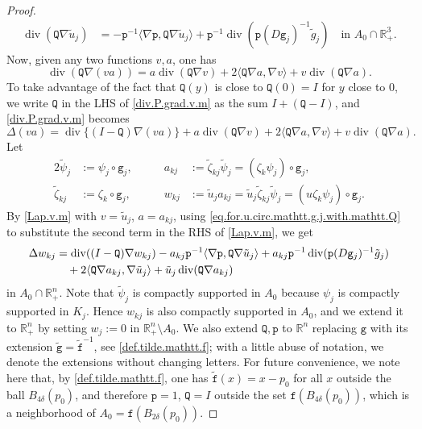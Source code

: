 \documentclass[10pt,reqno,a4paper]{article}
\numberwithin{equation}{section}
\theoremstyle{plain}
\theoremstyle{definition}
\newcommand{\R}{{\mathbb R}}
\newcommand{\la}{\langle}
\newcommand{\ra}{\rangle}
\newcommand{\grad}{\nabla}
\DeclareMathOperator{\divergence}{div}
\begin{document}
\begin{proof}
\begin{align} 
\divergence (\mathtt Q \grad \tilde u_j) 
& = - \mathtt p^{-1} \la \grad \mathtt p , \mathtt Q \grad \tilde u_j \ra
+ \mathtt p^{-1} \divergence (\mathtt p (D \mathtt g_j)^{-1} \tilde g_j) 
\quad \text{in } A_0 \cap \R^3_+.
\label{eq.for.u.circ.mathtt.g.j.with.mathtt.Q}
\end{align}
Now, given any two functions $v,a$, one has 
\begin{equation} \label{div.P.grad.v.m}
\divergence (\mathtt Q \grad (va)) 
= a \divergence (\mathtt Q \grad v) 
+ 2 \la \mathtt Q \grad a , \grad v \ra 
+ v \divergence (\mathtt Q \grad a).
\end{equation}
To take advantage of the fact that $\mathtt Q(y)$ is close to $\mathtt Q(0) = I$ for $y$ close to $0$, 
we write $\mathtt Q$ in the LHS of \eqref{div.P.grad.v.m} 
as the sum $I + (\mathtt Q - I)$, and \eqref{div.P.grad.v.m} becomes 
\begin{equation} \label{Lap.v.m}
\Delta (va)
= \divergence \{ (I - \mathtt Q) \grad (va) \}
+ a \divergence (\mathtt Q \grad v) 
+ 2 \la \mathtt Q \grad a , \grad v \ra 
+ v \divergence ( \mathtt Q \grad a).
\end{equation}
Let 
\begin{alignat}{2}
\tilde \psi_j & := \psi_j \circ \mathtt g_j, \qquad & 
a_{kj} & := \tilde \zeta_{kj} \tilde \psi_j = (\zeta_k \psi_j) \circ \mathtt g_j, 
\label{def.a.kj}
\\ 
\tilde \zeta_{kj} & := \zeta_k \circ \mathtt g_j, \qquad &  
w_{kj} & := \tilde u_j a_{kj} = \tilde u_j \tilde \zeta_{kj} \tilde \psi_j
= (u \zeta_k \psi_j) \circ \mathtt g_j.
\label{def.w.kj}
\end{alignat} 
By \eqref{Lap.v.m} with $v = \tilde u_j$, $a = a_{kj}$, 
using \eqref{eq.for.u.circ.mathtt.g.j.with.mathtt.Q} 
to substitute the second term in the RHS of \eqref{Lap.v.m}, 
we get 
\begin{align} 
\Delta w_{kj} 
& = \divergence ((I - \mathtt Q) \grad w_{kj} ) 
- a_{kj} \mathtt p^{-1} \la \grad \mathtt p , \mathtt Q \grad \tilde u_j \ra
+ a_{kj} \mathtt p^{-1} \divergence (\mathtt p (D \mathtt g_j)^{-1} \tilde g_j) 
\notag \\ & \quad  
+ 2 \la \mathtt Q \grad a_{kj} , \grad \tilde u_j \ra
+ \tilde u_j \divergence ( \mathtt Q \grad a_{kj} )
\label{eq.Lap.w}
\end{align}
in $A_0 \cap \R^n_+$. 
Note that $\tilde \psi_j$ is compactly supported in $A_0$ 
because $\psi_j$ is compactly supported in $K_j$. 
Hence $w_{kj}$ is also compactly supported in $A_0$, and we 
extend it to $\R^n_+$ by setting $w_j := 0$ in $\R^n_+ \setminus A_0$. 
We also extend $\mathtt Q, \mathtt p$ to $\R^n$ 
replacing $\mathtt g$ with its extension 
$\tilde{\mathtt g} = \tilde{\mathtt f}^{-1}$, see \eqref{def.tilde.mathtt.f};
with a little abuse of notation, we denote the extensions without changing letters.
For future convenience, we note here that, 
by \eqref{def.tilde.mathtt.f}, one has $\tilde{\mathtt f}(x) = x - p_0$ 
for all $x$ outside the ball $B_{4\delta}(p_0)$, 
and therefore $\mathtt p = 1$, $\mathtt Q = I$ 
outside the set $\mathtt f(B_{4\delta}(p_0))$, 
which is a neighborhood of $A_0 = \mathtt f(B_{2\delta}(p_0))$. 


\end{proof}
\end{document}
